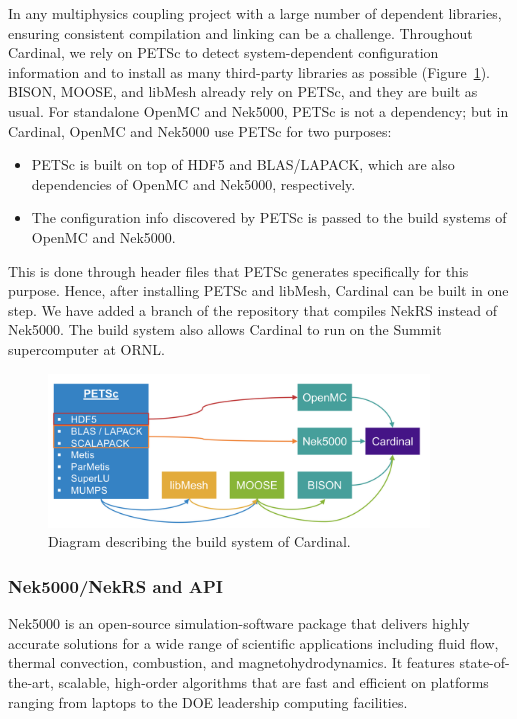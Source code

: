 In any multiphysics coupling project with a large number of dependent libraries, ensuring consistent compilation and linking can be a challenge. Throughout Cardinal, we rely on PETSc to detect system-dependent configuration information and to install as many third-party libraries as possible (Figure~\ref{f:build}). BISON, MOOSE, and libMesh already rely on PETSc, and they are built as usual. For standalone OpenMC and
Nek5000, PETSc is not a dependency; but in Cardinal, OpenMC and Nek5000 use PETSc for two purposes:
\begin{itemize}
\item PETSc is built on top of HDF5 and BLAS/LAPACK, which are also dependencies of OpenMC and Nek5000, respectively.
\item The configuration info discovered by PETSc is passed to the build systems of OpenMC and Nek5000.
\end{itemize}
This is done through header files that PETSc generates specifically for this purpose. Hence, after installing PETSc and libMesh, Cardinal can be built in one step.
We have added a branch of the repository that compiles NekRS instead of Nek5000. The build system also allows Cardinal to run on the Summit supercomputer at ORNL.
\begin{figure}[!h]
\centering
\includegraphics[clip=true,width=0.9\textwidth]{Figures/build}
\caption{Diagram describing the build system of Cardinal.}
\label{f:build}
\end{figure}

\subsubsection{Nek5000/NekRS and API}

Nek5000 \cite{fischer2015nek5000} is an open-source simulation-software package that delivers highly accurate solutions for a wide range of scientific applications including
fluid flow, thermal convection, combustion, and magnetohydrodynamics. It features state-of-the-art, scalable, high-order algorithms that are fast and efficient on platforms ranging from laptops to the DOE leadership computing facilities.

